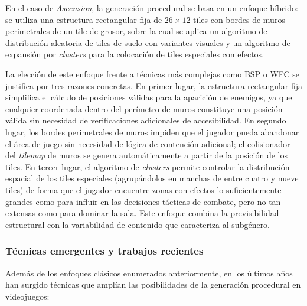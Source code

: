 En el caso de \textit{Ascension}, la generación procedural se basa en un enfoque híbrido: se utiliza una estructura rectangular fija de $26 \times 12$ tiles con bordes de muros perimetrales de un tile de grosor, sobre la cual se aplica un algoritmo de distribución aleatoria de tiles de suelo con variantes visuales y un algoritmo de expansión por \textit{clusters} para la colocación de tiles especiales con efectos.

La elección de este enfoque frente a técnicas más complejas como BSP o WFC se justifica por tres razones concretas. En primer lugar, la estructura rectangular fija simplifica el cálculo de posiciones válidas para la aparición de enemigos, ya que cualquier coordenada dentro del perímetro de muros constituye una posición válida sin necesidad de verificaciones adicionales de accesibilidad. En segundo lugar, los bordes perimetrales de muros impiden que el jugador pueda abandonar el área de juego sin necesidad de lógica de contención adicional; el colisionador del \textit{tilemap} de muros se genera automáticamente a partir de la posición de los tiles. En tercer lugar, el algoritmo de \textit{clusters} permite controlar la distribución espacial de los tiles especiales (agrupándolos en manchas de entre cuatro y nueve tiles) de forma que el jugador encuentre zonas con efectos lo suficientemente grandes como para influir en las decisiones tácticas de combate, pero no tan extensas como para dominar la sala. Este enfoque combina la previsibilidad estructural con la variabilidad de contenido que caracteriza al subgénero.

\medskip

\subsubsection{Técnicas emergentes y trabajos recientes}


Además de los enfoques clásicos enumerados anteriormente, en los últimos años han surgido técnicas que amplían las posibilidades de la generación procedural en videojuegos:

